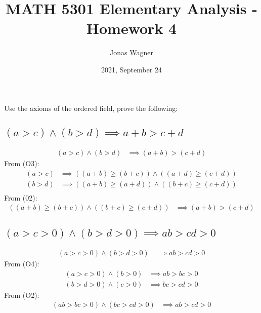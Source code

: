 \documentclass[]{article}
\title{MATH 5301 Elementary Analysis - Homework 4}
\author{Jonas Wagner}
\date{2021, September 24}
\begin{document}
\maketitle

\section{}
Use the axioms of the ordered field, prove the following:
\subsection{$(a > c) \land (b > d) \implies a + b > c + d$}
\begin{align*}
    (a > c) \land (b > d) &\implies (a + b) > (c + d)
\end{align*}
From (O3):
\begin{align*}
    (a > c) &\implies ((a + b) \geq (b + c)) \land ((a + d) \geq (c + d))\\
    (b > d) &\implies ((a + b) \geq (a + d)) \land ((b + c) \geq (c + d))\\
\end{align*}
From (02):
\begin{align*}
    ((a + b) \geq (b + c)) \land ((b + c) \geq (c + d))
        &\implies (a + b) > (c + d)
\end{align*}

\subsection{$(a > c > 0) \land (b > d > 0) \implies ab > cd > 0$}
\begin{align*}
    (a > c > 0) \land (b > d > 0) &\implies ab > cd > 0
\end{align*}
From (O4):
\begin{align*}
    (a > c > 0) \land (b > 0) &\implies ab > bc > 0\\
    (b > d > 0) \land (c > 0) &\implies bc > cd > 0
\end{align*}
From (O2):
\begin{align*}
    (ab > bc > 0) \land (bc > cd > 0) &\implies ab > cd > 0
\end{align*}

\newpage
\end{document}
